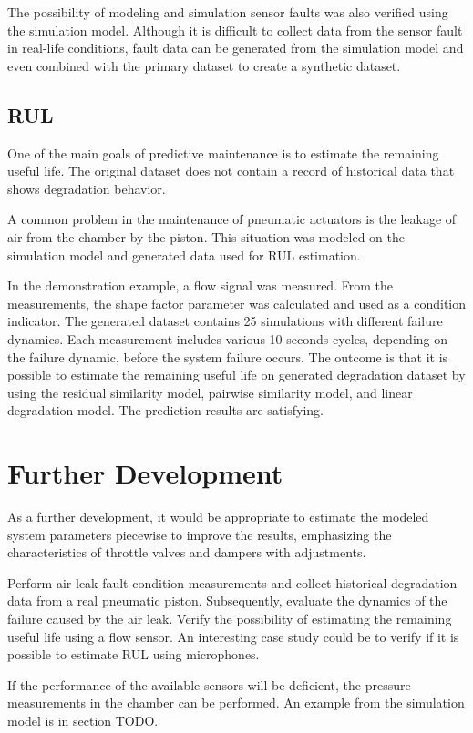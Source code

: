 The possibility of modeling and simulation sensor faults was also verified
using the simulation model. Although it is difficult to collect data from
the sensor fault in real-life conditions, fault data can be generated from
the simulation model and even combined with the primary dataset to create a
synthetic dataset.

\subsection{RUL}
One of the main goals of predictive maintenance is to estimate the
remaining useful life. The original dataset does not contain a record of
historical data that shows degradation behavior. 

A common problem in the maintenance of pneumatic actuators is the leakage
of air from the chamber by the piston. This situation was modeled on the
simulation model and generated data used for RUL estimation. 

In the demonstration example, a flow signal was measured. From the
measurements, the shape factor parameter was calculated and used as a
condition indicator. The generated dataset contains 25 simulations with
different failure dynamics. Each measurement includes various 10 seconds
cycles, depending on the failure dynamic, before the system failure occurs.
The outcome is that it is possible to estimate the remaining useful life on
generated degradation dataset by using the residual similarity model,
pairwise similarity model, and linear degradation model. The prediction
results are satisfying.

\section{Further Development}
As a further development, it would be appropriate to estimate the modeled
system parameters piecewise to improve the results, emphasizing the
characteristics of throttle valves and dampers with adjustments. 

Perform air leak fault condition measurements and collect historical
degradation data from a real pneumatic piston. Subsequently, evaluate the
dynamics of the failure caused by the air leak. Verify the possibility of
estimating the remaining useful life using a flow sensor. An interesting
case study could be to verify if it is possible to estimate RUL using
microphones.

If the performance of the available sensors will be deficient, the pressure
measurements in the chamber can be performed. An example from the
simulation model is in section TODO.



